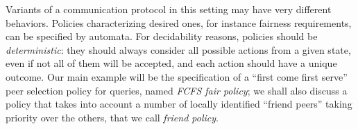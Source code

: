Variants of a communication protocol in this setting may have very different behaviors. Policies characterizing desired ones, for instance fairness requirements, can be specified by automata.
For decidability reasons, policies should be \emph{deterministic}: they should always consider all possible actions from a given state, even if not all of them will be accepted, and each action should have a unique outcome. 
%
Our main example will be the %
specification of a ``first come first serve'' peer selection policy for queries, named \emph{FCFS fair policy}; we shall also discuss a policy that takes into account a number of locally identified ``friend peers'' taking priority over the others, that we call \emph{friend policy}. 



